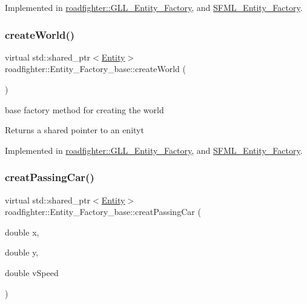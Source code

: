 Implemented in \hyperlink{classroadfighter_1_1GLL__Entity__Factory_a81737f6acc8d3c460b4d244cf06baeec}{roadfighter\+::\+G\+L\+L\+\_\+\+Entity\+\_\+\+Factory}, and \hyperlink{classSFML__Entity__Factory_ac65176cfefa77f5f4af79f88ed244478}{S\+F\+M\+L\+\_\+\+Entity\+\_\+\+Factory}.

\mbox{\label{classroadfighter_1_1Entity__Factory__base_aa24de6bbeb80c25e96f3e24d6bcb5169}} 
\subsubsection{\texorpdfstring{create\+World()}{createWorld()}}
{\footnotesize\ttfamily virtual std\+::shared\+\_\+ptr$<$\hyperlink{classroadfighter_1_1Entity}{Entity}$>$ roadfighter\+::\+Entity\+\_\+\+Factory\+\_\+base\+::create\+World (\begin{DoxyParamCaption}{ }\end{DoxyParamCaption})\hspace{0.3cm}{\ttfamily [pure virtual]}}

base factory method for creating the world \begin{DoxyReturn}{Returns}
a shared pointer to an enityt 
\end{DoxyReturn}


Implemented in \hyperlink{classroadfighter_1_1GLL__Entity__Factory_a80f9f647f1192ddc098b2aa4f0172168}{roadfighter\+::\+G\+L\+L\+\_\+\+Entity\+\_\+\+Factory}, and \hyperlink{classSFML__Entity__Factory_a3a6743085eb4c1793be523fe07724328}{S\+F\+M\+L\+\_\+\+Entity\+\_\+\+Factory}.

\mbox{\label{classroadfighter_1_1Entity__Factory__base_aa21b8cb23696844b7349ccf2c87d10fa}} 
\subsubsection{\texorpdfstring{creat\+Passing\+Car()}{creatPassingCar()}}
{\footnotesize\ttfamily virtual std\+::shared\+\_\+ptr$<$\hyperlink{classroadfighter_1_1Entity}{Entity}$>$ roadfighter\+::\+Entity\+\_\+\+Factory\+\_\+base\+::creat\+Passing\+Car (\begin{DoxyParamCaption}\item[{double}]{x,  }\item[{double}]{y,  }\item[{double}]{v\+Speed }\end{DoxyParamCaption})\hspace{0.3cm}{\ttfamily [pure virtual]}}

